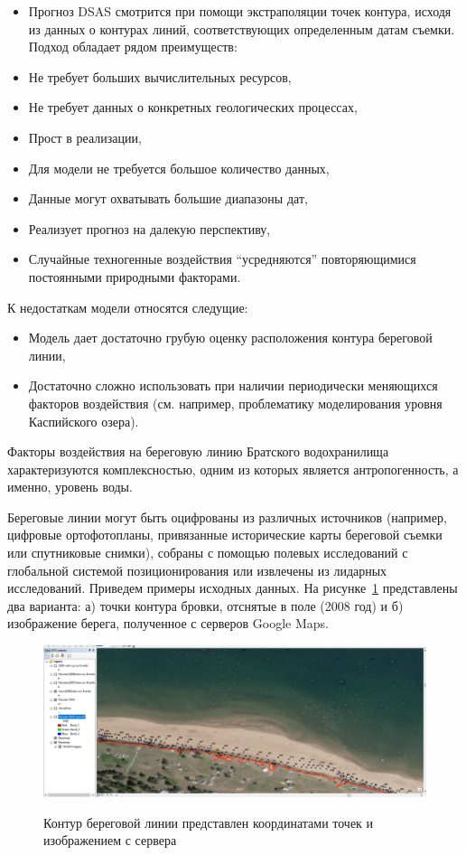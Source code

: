 \documentclass[732,fontsize=14pt,final]{studrep}
\begin{document}
\begin{itemize}
\item Прогноз DSAS смотрится при помощи экстраполяции точек контура, исходя из данных о контурах линий, соответствующих определенным датам съемки. Подход обладает рядом преимуществ:
\item   Не требует больших вычислительных ресурсов,
\item   Не требует данных о конкретных геологических процессах,
\item   Прост в реализации,
\item   Для модели не требуется большое количество данных,
\item   Данные могут охватывать большие диапазоны дат,
\item   Реализует прогноз на далекую перспективу,
\item   Случайные техногенные воздействия “усредняются” повторяющимися постоянными природными факторами.
\end{itemize}

К недостаткам модели относятся следущие:

\begin{itemize}
\item Модель дает достаточно грубую оценку расположения контура береговой линии,
\item Достаточно сложно использовать при наличии периодически меняющихся факторов воздействия (см. например, проблематику моделирования уровня Каспийского озера).
\end{itemize}
Факторы воздействия на береговую линию Братского водохранилища характеризуются комплексностью, одним из которых является антропогенность, а именно, уровень воды. 

Береговые линии могут быть оцифрованы из различных источников (например, цифровые ортофотопланы, привязанные исторические карты береговой съемки или спутниковые снимки), собраны с помощью полевых исследований с глобальной системой позиционирования или извлечены из лидарных исследований. Приведем примеры исходных данных. На рисунке~\ref{fig:google-src} представлены два варианта: а) точки контура бровки, отснятые в поле (2008 год) и б) изображение берега, полученное с серверов Google Maps.

\begin{figure}[htp]
  \centering
  \includegraphics[width=\linewidth]{pics/image22.png}\label{fig:google-src}
  \caption{Контур береговой линии представлен координатами точек и изображением с сервера}
\end{figure}
\end{document}
